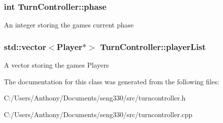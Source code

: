 \subsubsection[{phase}]{\setlength{\rightskip}{0pt plus 5cm}int Turn\+Controller\+::phase}\label{class_turn_controller_a0e38c2319d233f54fe0a5daaa5fef964}
An integer storing the game\textquotesingle{}s current phase \hypertarget{class_turn_controller_a4f25fffc1441f66610f2ba821ac77d36}{}
\subsubsection[{player\+List}]{\setlength{\rightskip}{0pt plus 5cm}std\+::vector$<${\bf Player}$\ast$$>$ Turn\+Controller\+::player\+List}\label{class_turn_controller_a4f25fffc1441f66610f2ba821ac77d36}
A vector storing the game\textquotesingle{}s Players 

The documentation for this class was generated from the following files\+:\begin{DoxyCompactItemize}
\item 
C\+:/\+Users/\+Anthony/\+Documents/seng330/src/turncontroller.\+h\item 
C\+:/\+Users/\+Anthony/\+Documents/seng330/src/turncontroller.\+cpp\end{DoxyCompactItemize}
